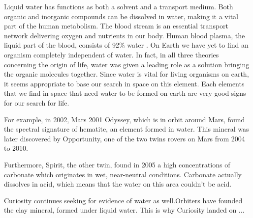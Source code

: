Liquid water has functions as both a solvent and a transport medium.
Both organic and inorganic compounds can be dissolved in water, making it a vital part of the human metabolism.
The blood stream is an essential transport network delivering oxygen and nutrients in our body.
Human blood plasma, the liquid part of the blood, consists of 92\% water \cite{Blood}.
On Earth we have yet to find an organism completely independent of water.
In fact, in all three theories concerning the origin of life, water was given a leading role as a solution bringing the organic molecules together.
Since water is vital for living organisms on earth, it seems appropriate to base our search in space on this element.
Each elements that we find in space that need water to be formed on earth are very good signs for our search for life.

For example, in 2002, Mars 2001 Odyssey, which is in orbit around Mars, found the spectral signature of hematite, an element formed in water.
This mineral was later discovered by Opportunity, one of the two twins rovers on Mars from 2004 to 2010.

Furthermore, Spirit, the other twin, found in 2005 a high concentrations of carbonate which originates in wet, near-neutral conditions.
Carbonate actually dissolves in acid, which means that the water on this area couldn't be acid.

Curiosity continues seeking for evidence of water as well.Orbiters have founded the clay mineral, formed under liquid water.
This is why Curiosity landed on ...